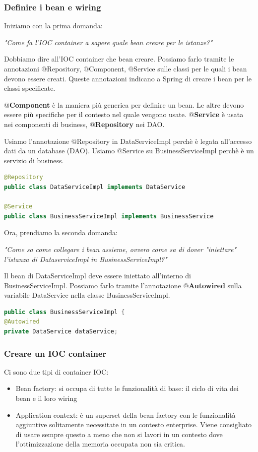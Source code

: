 \documentclass[11pt,a4paper]{book}
\begin{document}
\subsubsection{Definire i bean e wiring}
Iniziamo con la prima domanda: 
\begin{center}
	\emph{"Come fa l'IOC container a sapere quale bean creare per le istanze?"}
\end{center}

Dobbiamo dire all'IOC container che bean creare. Possiamo farlo tramite le annotazioni $@$Repository, $@$Component, $@$Service sulle classi per le quali i bean devono essere creati. Queste annotazioni indicano a Spring di creare i bean per le classi specificate.

\textbf{$@$Component} è la maniera più generica per definire un bean. Le altre devono essere più specifiche per il contesto nel quale vengono usate. \textbf{$@$Service} è usata nei componenti di business, \textbf{$@$Repository} nei DAO.

Usiamo l'annotazione $@$Repository in DataServiceImpl perchè è legata all'accesso dati da un database (DAO). Usiamo $@$Service su BusinessServiceImpl perchè è un servizio di business.
\begin{lstlisting}[language = Java]
@Repository
public class DataServiceImpl implements DataService

@Service
public class BusinessServiceImpl implements BusinessService
\end{lstlisting}

Ora, prendiamo la seconda domanda: 
\begin{center}
	\emph{"Come sa come collegare i bean assieme, ovvero come sa di dover "iniettare" l'istanza di DataserviceImpl in BusinessServiceImpl?"}
\end{center}
Il bean di DataServiceImpl deve essere iniettato all'interno di BusinessServiceImpl. Possiamo farlo tramite l'annotazione \textbf{$@$Autowired} sulla variabile DataService nella classe BusinessServiceImpl.
\begin{lstlisting}[language = Java]
public class BusinessServiceImpl {
@Autowired
private DataService dataService;
\end{lstlisting}

\subsubsection{Creare un IOC container}
Ci sono due tipi di container IOC:
\begin{itemize}
	\item Bean factory: si occupa di tutte le funzionalità di base: il ciclo di vita dei bean e il loro wiring
	\item Application context: è un superset della bean factory con le funzionalità aggiuntive solitamente necessitate in un contesto enterprise. Viene consigliato di usare sempre questo a meno che non si lavori in un contesto dove l'ottimizzazione della memoria occupata non sia critica.
\end{itemize}
\end{document}
